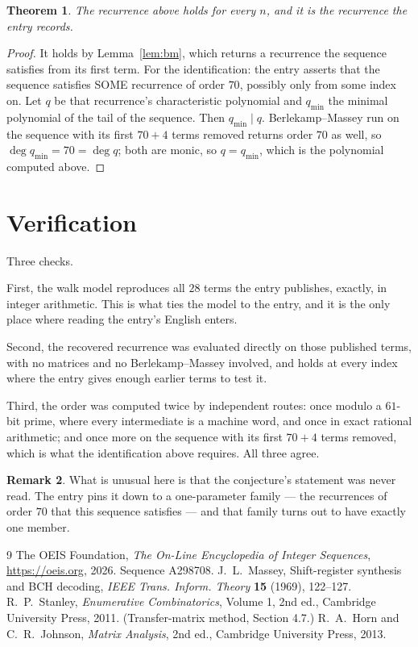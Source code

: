 \documentclass[11pt,a4paper]{article}
\theoremstyle{plain}
\newtheorem{theorem}{Theorem}
\theoremstyle{definition}
\newtheorem{remark}[theorem]{Remark}
\begin{document}
\begin{theorem}
The recurrence above holds for every $n$, and it is the recurrence the entry records.
\end{theorem}

\begin{proof}
It holds by Lemma~\ref{lem:bm}, which returns a recurrence the sequence satisfies from its
first term. For the identification: the entry asserts that the sequence satisfies SOME
recurrence of order $70$, possibly only from some index on. Let $q$ be that recurrence's
characteristic polynomial and $q_{\min}$ the minimal polynomial of the tail of the sequence.
Then $q_{\min}\mid q$. Berlekamp--Massey run on the sequence with its first $70+4$ terms
removed returns order $70$ as well, so $\deg q_{\min}=70=\deg q$; both are monic, so
$q=q_{\min}$, which is the polynomial computed above.
\end{proof}

\section{Verification}

Three checks.

First, the walk model reproduces all $28$ terms the entry publishes, exactly, in integer
arithmetic. This is what ties the model to the entry, and it is the only place where reading
the entry's English enters.

Second, the recovered recurrence was evaluated directly on those published terms, with no
matrices and no Berlekamp--Massey involved, and holds at every index where the entry gives
enough earlier terms to test it.

Third, the order was computed twice by independent routes: once modulo a $61$-bit prime, where
every intermediate is a machine word, and once in exact rational arithmetic; and once more on
the sequence with its first $70+4$ terms removed, which is what the identification above
requires. All three agree.

\begin{remark}
What is unusual here is that the conjecture's statement was never read. The entry pins it down
to a one-parameter family --- the recurrences of order $70$ that this sequence satisfies
--- and that family turns out to have exactly one member.
\end{remark}

\begin{thebibliography}{9}
 The OEIS Foundation, \emph{The On-Line Encyclopedia of Integer
Sequences}, \url{https://oeis.org}, 2026. Sequence A298708.
 J.~L.~Massey, Shift-register synthesis and BCH decoding, \emph{IEEE
Trans. Inform. Theory} \textbf{15} (1969), 122--127.
 R.~P.~Stanley, \emph{Enumerative Combinatorics}, Volume 1, 2nd ed.,
Cambridge University Press, 2011. (Transfer-matrix method, Section 4.7.)
 R.~A.~Horn and C.~R.~Johnson, \emph{Matrix Analysis}, 2nd ed., Cambridge
University Press, 2013.
\end{thebibliography}
\end{document}
